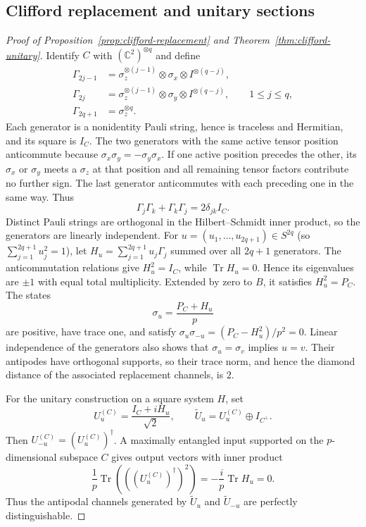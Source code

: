 \documentclass[11pt,a4paper]{article}
\theoremstyle{definition}
\theoremstyle{plain}
\theoremstyle{remark}
\DeclareMathOperator{\Tr}{Tr}
\begin{document}
\subsection{Clifford replacement and unitary sections}
\label{app:clifford-proof}

\begin{proof}[Proof of Proposition~\ref{prop:clifford-replacement} and Theorem~\ref{thm:clifford-unitary}]
Identify $C$ with $(\mathbb C^2)^{\otimes q}$ and define
\begin{align*}
\Gamma_{2j-1}
&=\sigma_z^{\otimes(j-1)}\otimes\sigma_x
  \otimes I^{\otimes(q-j)},\\
\Gamma_{2j}
&=\sigma_z^{\otimes(j-1)}\otimes\sigma_y
  \otimes I^{\otimes(q-j)},
\qquad1\leq j\leq q,\\
\Gamma_{2q+1}&=\sigma_z^{\otimes q}.
\end{align*}
Each generator is a nonidentity Pauli string, hence is traceless and
Hermitian, and its square is $I_C$. The two generators with the same active
tensor position anticommute because
$\sigma_x\sigma_y=-\sigma_y\sigma_x$. If one active position precedes the
other, its $\sigma_x$ or $\sigma_y$ meets a $\sigma_z$ at that position and
all remaining tensor factors contribute no further sign. The last generator
anticommutes with each preceding one in the same way. Thus
\[
\Gamma_j\Gamma_k+\Gamma_k\Gamma_j=2\delta_{jk}I_C.
\]
Distinct Pauli strings are orthogonal in the Hilbert--Schmidt inner product,
so the generators are linearly independent. For $u=(u_1,\ldots,u_{2q+1})\in S^{2q}$ (so $\sum_{j=1}^{2q+1}u_j^2=1$), let
$H_u=\sum_{j=1}^{2q+1}u_j\Gamma_j$ summed over all $2q+1$ generators. The anticommutation
relations give $H_u^2=I_C$, while $\Tr H_u=0$. Hence its eigenvalues are
$\pm1$ with equal total multiplicity. Extended by zero to $B$, it satisfies
$H_u^2=P_C$. The states
\[
\sigma_u=\frac{P_C+H_u}{p}
\]
are positive, have trace one, and satisfy
$\sigma_u\sigma_{-u}=(P_C-H_u^2)/p^2=0$. Linear independence of the
generators also shows that $\sigma_u=\sigma_v$ implies $u=v$.
Their antipodes have orthogonal supports, so their trace norm, and hence
the diamond distance of the associated replacement channels, is $2$.

For the unitary construction on a square system $H$, set
\[
U_u^{(C)}=\frac{I_C+iH_u}{\sqrt2},
\qquad
\widetilde U_u=U_u^{(C)}\oplus I_{C^\perp}.
\]
Then $U_{-u}^{(C)}=(U_u^{(C)})^\dagger$. A maximally entangled input
supported on the $p$-dimensional subspace $C$ gives output vectors with
inner product
\[
\frac1p\Tr(((U_u^{(C)})^\dagger)^2)
=-\frac{i}{p}\Tr H_u=0.
\]
Thus the antipodal channels generated by $\widetilde U_u$ and
$\widetilde U_{-u}$ are perfectly distinguishable.
\end{proof}
\end{document}
